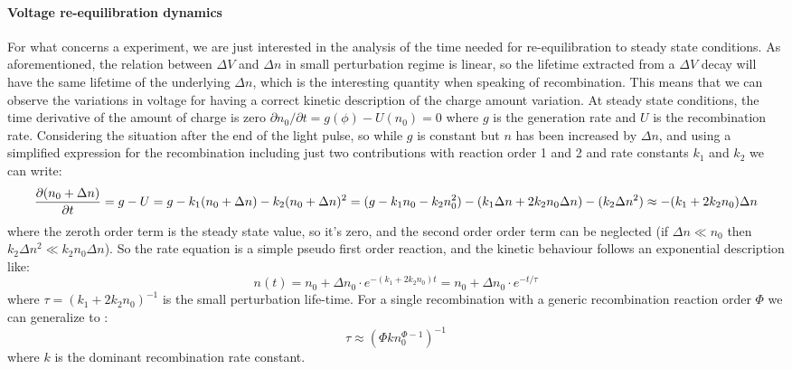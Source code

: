 		\paragraph{Voltage re\hyp{}equilibration dynamics}
		For what concerns a  experiment, we are just interested in the analysis of the time needed for re\hyp{}equilibration to steady state conditions.
		As aforementioned, the relation between $\Delta V$ and $\Delta n$ in small perturbation regime is linear, so the lifetime extracted from a $\Delta V$ decay will have the same lifetime of the underlying $\Delta n$, which is the interesting quantity when speaking of recombination.
		This means that we can observe the variations in voltage for having a correct kinetic description of the charge amount variation.
		At steady state conditions, the time derivative of the amount of charge is zero $\partial n_0 / \partial t = g(\phi) - U(n_0) = 0$ where $g$ is the generation rate and $U$ is the recombination rate.
		Considering the situation after the end of the light pulse, so while $g$ is constant but $n$ has been increased by $\Delta n$, and using a simplified expression for the recombination including just two contributions with reaction order 1 and 2 and rate constants $k_1$ and $k_2$ we can write:
		\begin{dmath}
			\pdv{(n_0 + \Delta n)}{t} = g - U = g - k_1(n_0 + \Delta n) - k_2(n_0 + \Delta n)^2 = (g - k_1 n_0 - k_2 n_0^2) - (k_1 \Delta n + 2 k_2 n_0 \Delta n) - (k_2 \Delta n ^2) \approx - (k_1 + 2 k_2 n_0 ) \Delta n
		\end{dmath}
		where the zeroth order term is the steady state value, so it's zero, and the second order order term can be neglected (if $\Delta n \ll n_0$ then $k_2 \Delta n^2 \ll k_2 n_0 \Delta n$).
		So the rate equation is a simple pseudo first order reaction, and the kinetic behaviour follows an exponential description like:
		\begin{equation}\label{eq:tpv_monoexp}
			n (t) = n_0 + \Delta n_0 \cdot e^{-(k_1 + 2 k_2 n_0) t} = n_0 + \Delta n_0 \cdot e^{-t / \tau}
		\end{equation}
		where $\tau = (k_1 + 2 k_2 n_0)^{-1}$ is the small perturbation life\hyp{}time.
		For a single recombination with a generic recombination reaction order $\Phi$ we can generalize to \cite{Shuttle2008}:
		\begin{equation}\label{eq:tpv_tau_order}
			\tau \approx (\Phi k n_0^{\Phi-1})^{-1}
		\end{equation}
		where $k$ is the dominant recombination rate constant.

